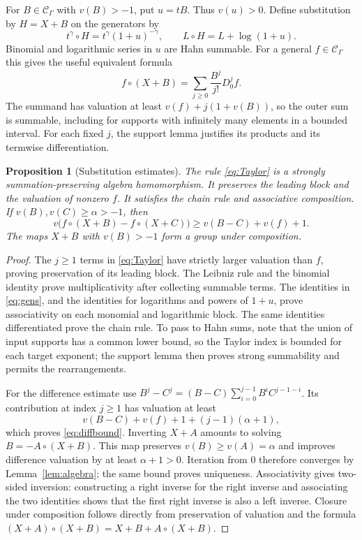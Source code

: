 \documentclass[11pt,a4paper]{article}
\newtheorem{proposition}[theorem]{Proposition}
\theoremstyle{definition}
\theoremstyle{remark}
\newcommand{\C}{\mathcal C_\Gamma}
\begin{document}
For $B\in\C$ with $v(B)>-1$, put $u=tB$. Thus $v(u)>0$. Define
substitution by $H=X+B$ on the generators by
\begin{equation}\label{eq:gens}
 t^\gamma\circ H=t^\gamma(1+u)^{-\gamma},\qquad
 L\circ H=L+\log(1+u).
\end{equation}
Binomial and logarithmic series in $u$ are Hahn summable. For a general
$f\in\C$ this gives the useful equivalent formula
\begin{equation}\label{eq:Taylor}
 f\circ(X+B)=\sum_{j\ge0}\frac{B^j}{j!}D_0^j f.
\end{equation}
The summand has valuation at least $v(f)+j(1+v(B))$, so the outer sum is
summable, including for supports with infinitely many elements in a bounded
interval. For each fixed $j$, the support lemma justifies its products and
its termwise differentiation.

\begin{proposition}[Substitution estimates]\label{prop:subst}
The rule \eqref{eq:Taylor} is a strongly summation-preserving algebra
homomorphism. It preserves the leading block and the valuation of nonzero
$f$. It satisfies the chain rule and associative composition. If
$v(B),v(C)\ge\alpha>-1$, then
\begin{equation}\label{eq:diffbound}
 v\bigl(f\circ(X+B)-f\circ(X+C)\bigr)
 \ge v(B-C)+v(f)+1.
\end{equation}
The maps $X+B$ with $v(B)>-1$ form a group under composition.
\end{proposition}
\begin{proof}
The $j\ge1$ terms in \eqref{eq:Taylor} have strictly larger valuation than
$f$, proving preservation of its leading block. The Leibniz rule and the
binomial identity prove multiplicativity after collecting summable terms.
The identities in \eqref{eq:gens}, and the identities for logarithms and
powers of $1+u$, prove associativity on each monomial and logarithmic block.
The same identities differentiated prove the chain rule. To pass to Hahn
sums, note that the union of input supports has a common lower bound, so the
Taylor index is bounded for each target exponent; the support lemma then
proves strong summability and permits the rearrangements.

For the difference estimate use
$B^j-C^j=(B-C)\sum_{i=0}^{j-1}B^iC^{j-1-i}$. Its contribution at index $j\ge1$
has valuation at least
\[
 v(B-C)+v(f)+1+(j-1)(\alpha+1),
\]
which proves \eqref{eq:diffbound}. Inverting $X+A$ amounts to solving
$B=-A\circ(X+B)$. This map preserves $v(B)\ge v(A)=\alpha$ and improves
difference valuation by at least $\alpha+1>0$. Iteration from $0$ therefore
converges by Lemma~\ref{lem:algebra}; the same bound proves uniqueness.
Associativity gives two-sided inversion: constructing a right inverse for
the right inverse and associating the two identities shows that the first
right inverse is also a left inverse. Closure under composition follows
directly from preservation of valuation and the formula
$(X+A)\circ(X+B)=X+B+A\circ(X+B)$.
\end{proof}
\end{document}
